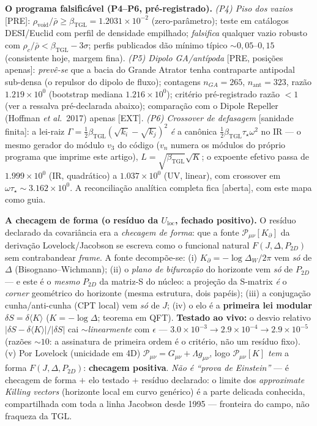 \documentclass[11pt]{article}
\newcommand{\bTGL}{\beta_{\mathrm{TGL}}}\newcommand{\Msun}{M_{\odot}}\newcommand{\TGL}{\mathrm{TGL}}
\theoremstyle{definition}\newtheorem{deriv}{Derivação}
\begin{document}
\textbf{O programa falsificável (P4--P6, pré-registrado).} \emph{(P4) Piso dos vazios} [PRE]: $\rho_{\mathrm{void}}/\bar\rho\ge\bTGL=1.2031\times10^{-2}$ (zero-parâmetro); teste em catálogos DESI/Euclid com perfil de densidade empilhado; \emph{falsifica} qualquer vazio robusto com $\rho_c/\bar\rho<\bTGL-3\sigma$; perfis publicados dão mínimo típico $\sim0{,}05$--$0{,}15$ (consistente hoje, margem fina). \emph{(P5) Dipolo GA/antípoda} [PRE, posições apenas]: \emph{prevê-se} que a bacia do Grande Atrator tenha contraparte antipodal sub-densa (o repulsor do dipolo de fluxo); contagens $n_{GA}=265$, $n_{\mathrm{ant}}=323$, razão $1.219\times10^{0}$ (bootstrap mediana $1.216\times10^{0}$); critério pré-registrado razão $<1$ (ver a ressalva pré-declarada abaixo); comparação com o Dipole Repeller (Hoffman \emph{et al.}\ 2017) apenas [EXT]. \emph{(P6) Crossover de defasagem} [sanidade finita]: a lei-raiz $\Gamma=\tfrac12\bTGL(\sqrt{k_i}-\sqrt{k_j})^2$ \emph{é} a canônica $\tfrac12\bTGL\tau_\star\omega^2$ no IR --- o mesmo gerador do módulo $v_3$ do código ($v_n$ numera os módulos do próprio programa que imprime este artigo), $L=\sqrt{\bTGL}\sqrt{K}$; o expoente efetivo passa de $1.999\times10^{0}$ (IR, quadrático) a $1.037\times10^{0}$ (UV, linear), com crossover em $\omega\tau_\star\sim3.162\times10^{0}$. A reconciliação analítica completa fica [aberta], com este mapa como guia.

\textbf{A checagem de forma (o resíduo da $U_{\mathrm{loc}}$, fechado positivo).} O resíduo declarado da covariância era a \emph{checagem de forma}: que a fonte $\mathcal P_{\mu\nu}[K_\partial]$ da derivação Lovelock/Jacobson se escreva como o funcional natural $F(J,\Delta,P_{2D})$ sem contrabandear \emph{frame}. A fonte decompõe-se: (i) $K_\partial=-\log\Delta_W/2\pi$ vem \emph{só} de $\Delta$ (Bisognano--Wichmann); (ii) o \emph{plano de bifurcação} do horizonte vem \emph{só} de $P_{2D}$ --- e este é o \emph{mesmo} $P_{2D}$ da matriz-S do núcleo: a projeção da S-matrix \emph{é} o \emph{corner} geométrico do horizonte (mesma estrutura, dois papéis); (iii) a conjugação cunha/anti-cunha (CPT local) vem \emph{só} de $J$; (iv) o elo é a \textbf{primeira lei modular} $\delta S=\delta\langle K\rangle$ ($K=-\log\Delta$; teorema em QFT). \textbf{Testado ao vivo:} o desvio relativo $|\delta S-\delta\langle K\rangle|/|\delta S|$ cai $\sim$\emph{linearmente} com $\epsilon$ --- $3.0\times10^{-3}\to2.9\times10^{-4}\to2.9\times10^{-5}$ (razões $\sim10$: a assinatura de primeira ordem é o critério, não um resíduo fixo). (v) Por Lovelock (unicidade em 4D) $\mathcal P_{\mu\nu}=G_{\mu\nu}+\Lambda g_{\mu\nu}$, logo $\mathcal P_{\mu\nu}[K]$ \emph{tem} a forma $F(J,\Delta,P_{2D})$: \textbf{checagem positiva}. \emph{Não é ``prova de Einstein''} --- é checagem de forma $+$ elo testado $+$ resíduo declarado: o limite dos \emph{approximate Killing vectors} (horizonte local em curvo genérico) é a parte delicada conhecida, compartilhada com toda a linha Jacobson desde 1995 --- fronteira do campo, não fraqueza da $\TGL$.
\end{document}
